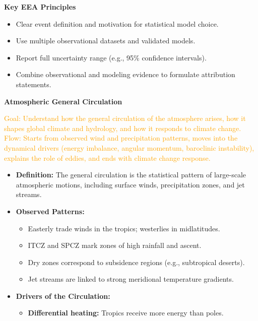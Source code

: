 \documentclass[fontsize=8pt, a4paper, landscape, fleqn]{scrartcl}
\renewcommand{\section}[1]{%
    \noindent\colorbox{sectioncolor}{%
        \parbox{\dimexpr\columnwidth-2\fboxsep}{\color{white}\textbf{#1}}}%
    \vspace{0.5mm}%
}
\renewcommand{\subsection}[1]{%
    \noindent\colorbox{subsectioncolor}{%
        \parbox{\dimexpr\columnwidth-2\fboxsep}{\color{white}\textbf{#1}}}%
    \vspace{0.5mm}%
}
\begin{document}
\begin{multicols*}{3}[\raggedcolumns]
\subsection{Key EEA Principles}
\begin{itemize}
    \item Clear event definition and motivation for statistical model choice.
    \item Use multiple observational datasets and validated models.
    \item Report full uncertainty range (e.g., 95\% confidence intervals).
    \item Combine observational and modeling evidence to formulate attribution statements.
\end{itemize}


\section{Atmospheric General Circulation}
\noindent\textcolor{orange}{
Goal: Understand how the general circulation of the atmosphere arises, how it shapes global climate and hydrology, and how it responds to climate change.\\
Flow: Starts from observed wind and precipitation patterns, moves into the dynamical drivers (energy imbalance, angular momentum, baroclinic instability), explains the role of eddies, and ends with climate change response.
}
\begin{itemize}
    \item \textbf{Definition:} The general circulation is the statistical pattern of large-scale atmospheric motions, including surface winds, precipitation zones, and jet streams.
    \item \textbf{Observed Patterns:}
    \begin{itemize}
        \item Easterly trade winds in the tropics; westerlies in midlatitudes.
        \item ITCZ and SPCZ mark zones of high rainfall and ascent.
        \item Dry zones correspond to subsidence regions (e.g., subtropical deserts).
        \item Jet streams are linked to strong meridional temperature gradients.
    \end{itemize}
    \item \textbf{Drivers of the Circulation:}
    \begin{itemize}
        \item \textbf{Differential heating:} Tropics receive more energy than poles.

\end{itemize}
\end{itemize}
\end{multicols*}
\end{document}
